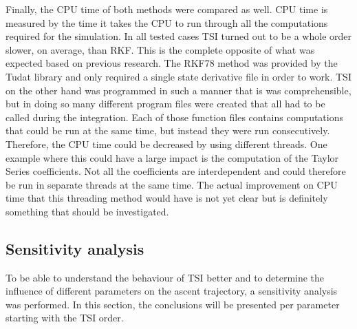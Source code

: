 Finally, the CPU time of both methods were compared as well. CPU time is measured by the time it takes the CPU to run through all the computations required for the simulation. In all tested cases \ac{TSI} turned out to be a whole order slower, on average, than \ac{RKF}. This is the complete opposite of what was expected based on previous research. The \ac{RKF78} method was provided by the \ac{Tudat} library and only required a single state derivative file in order to work. \ac{TSI} on the other hand was programmed in such a manner that is was comprehensible, but in doing so many different program files were created that all had to be called during the integration. Each of those function files contains computations that could be run at the same time, but instead they were run consecutively. Therefore, the CPU time could be decreased by using different threads. One example where this could have a large impact is the computation of the Taylor Series coefficients. Not all the coefficients are interdependent and could therefore be run in separate threads at the same time. The actual improvement on CPU time that this threading method would have is not yet clear but is definitely something that should be investigated.






\subsection{Sensitivity analysis}
\label{subsec:sensitivityAnalysis}
To be able to understand the behaviour of \ac{TSI} better and to determine the influence of different parameters on the ascent trajectory, a sensitivity analysis was performed. In this section, the conclusions will be presented per parameter starting with the \ac{TSI} order.

